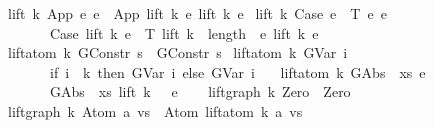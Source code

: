\begin{isabellebody}
{\isacharbar}{\kern0pt}\ {\isachardoublequoteopen}lift\ k\ {\isacharparenleft}{\kern0pt}App\ e{}\ e{}{\isacharparenright}{\kern0pt}\ {\isacharequal}{\kern0pt}\ App\ {\isacharparenleft}{\kern0pt}lift\ k\ e{}{\isacharparenright}{\kern0pt}\ {\isacharparenleft}{\kern0pt}lift\ k\ e{}{\isacharparenright}{\kern0pt}{\isachardoublequoteclose}\isanewline
{\isacharbar}{\kern0pt}\ {\isachardoublequoteopen}lift\ k\ {\isacharparenleft}{\kern0pt}Case\ e\ {\isasymGamma}\ T\ e{}\ e{}{\isacharparenright}{\kern0pt}\ {\isacharequal}{\kern0pt}\isanewline
\ \ \ \ \ \ \ Case\ {\isacharparenleft}{\kern0pt}lift\ k\ e{\isacharparenright}{\kern0pt}\ {\isasymGamma}\ T\ {\isacharparenleft}{\kern0pt}lift\ {\isacharparenleft}{\kern0pt}k\ {\isacharplus}{\kern0pt}\ length\ {\isasymGamma}{\isacharparenright}{\kern0pt}\ e{}{\isacharparenright}{\kern0pt}\ {\isacharparenleft}{\kern0pt}lift\ k\ e{}{\isacharparenright}{\kern0pt}{\isachardoublequoteclose}\isanewline
\isanewline
\ \ \isanewline
{\isacharbar}{\kern0pt}\ {\isachardoublequoteopen}lift{\isacharunderscore}{\kern0pt}atom\ k\ {\isacharparenleft}{\kern0pt}GConstr\ s{\isacharparenright}{\kern0pt}\ {\isacharequal}{\kern0pt}\ GConstr\ s{\isachardoublequoteclose}\isanewline
{\isacharbar}{\kern0pt}\ {\isachardoublequoteopen}lift{\isacharunderscore}{\kern0pt}atom\ k\ {\isacharparenleft}{\kern0pt}GVar\ i{\isacharparenright}{\kern0pt}\ {\isacharequal}{\kern0pt}\isanewline
\ \ \ \ \ \ \ {\isacharparenleft}{\kern0pt}if\ i\ {\isacharless}{\kern0pt}\ k\ then\ GVar\ i\ else\ GVar\ {\isacharparenleft}{\kern0pt}i\ {\isacharplus}{\kern0pt}\ {}{\isacharparenright}{\kern0pt}{\isacharparenright}{\kern0pt}{\isachardoublequoteclose}\isanewline
{\isacharbar}{\kern0pt}\ {\isachardoublequoteopen}lift{\isacharunderscore}{\kern0pt}atom\ k\ {\isacharparenleft}{\kern0pt}GAbs\ {\isasymtau}\ xs\ e{\isacharparenright}{\kern0pt}\ {\isacharequal}{\kern0pt}\isanewline
\ \ \ \ \ \ \ GAbs\ {\isasymtau}\ xs\ {\isacharparenleft}{\kern0pt}lift\ {\isacharparenleft}{\kern0pt}k\ {\isacharplus}{\kern0pt}\ {}{\isacharparenright}{\kern0pt}\ e{\isacharparenright}{\kern0pt}{\isachardoublequoteclose}\isanewline
\isanewline
\ \ \isanewline
{\isacharbar}{\kern0pt}\ {\isachardoublequoteopen}lift{\isacharunderscore}{\kern0pt}graph\ k\ Zero\ {\isacharequal}{\kern0pt}\ Zero{\isachardoublequoteclose}\isanewline
{\isacharbar}{\kern0pt}\ {\isachardoublequoteopen}lift{\isacharunderscore}{\kern0pt}graph\ k\ {\isacharparenleft}{\kern0pt}Atom\ a\ vs{\isacharparenright}{\kern0pt}\ {\isacharequal}{\kern0pt}\ Atom\ {\isacharparenleft}{\kern0pt}lift{\isacharunderscore}{\kern0pt}atom\ k\ a{\isacharparenright}{\kern0pt}\ vs{\isachardoublequoteclose}\isanewline

\end{isabellebody}
